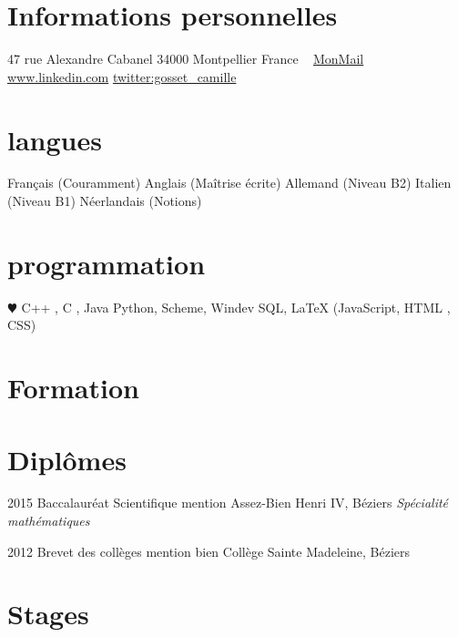 \documentclass[]{friggeri-cv}
\begin{document}

\begin{aside}
  \section{Informations personnelles}
    47 rue Alexandre Cabanel
    34000 Montpellier
    France
    ~
    \href{mailto:camille.gosset@etu.umomontpellier.fr}{MonMail}
    \href{http://www.linkedin.com/in/camille-gosset-9b01a012a}{www.linkedin.com}
    \href{http://twitter.com/gosset_camille}{twitter:gosset\_camille}
  \section{langues}
    Français (Couramment)
    Anglais (Maîtrise écrite)
    Allemand (Niveau B2)
    Italien (Niveau B1)
    Néerlandais (Notions)
  \section{programmation}
    {\color{red} $\varheartsuit$} C++ , C , Java
    Python, Scheme, Windev
    SQL, \LaTeX
    (JavaScript, HTML , CSS)    
\end{aside}


\section{Formation}

\begin{entrylist}
\end{entrylist}

\section{Diplômes}

\begin{entrylist}
  \entry
    {2015}
    {Baccalauréat Scientifique mention Assez-Bien}
    {Henri IV, Béziers}
    {\emph{Spécialité mathématiques}}
    
   \entry
    {2012}
    {Brevet des collèges mention bien}
    {Collège Sainte Madeleine, Béziers}
    {\emph{}}

\end{entrylist}

\section{Stages}
\end{document}
